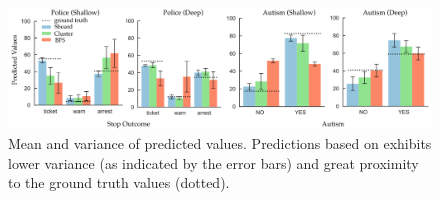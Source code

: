 \begin{figure}[bht]
\centering
\includegraphics[width=\linewidth]{figures/Prediction_Actual.png}
\caption{Mean and variance of predicted values. Predictions based on \system exhibits lower variance (as indicated by the error bars) and great proximity to the ground truth values (dotted).}
\label{fig:actual_predictions}
\end{figure}